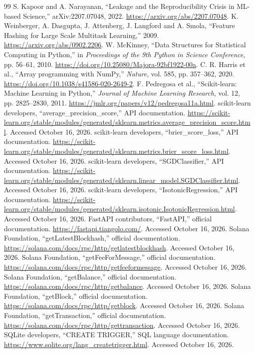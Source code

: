 \documentclass[12pt,a4paper,oneside]{report}
\begin{document}
\begin{thebibliography}{99}
 S. Kapoor and A. Narayanan, ``Leakage and the Reproducibility Crisis in ML-based Science,'' arXiv:2207.07048, 2022. \url{https://arxiv.org/abs/2207.07048}.
 K. Weinberger, A. Dasgupta, J. Attenberg, J. Langford and A. Smola, ``Feature Hashing for Large Scale Multitask Learning,'' 2009. \url{https://arxiv.org/abs/0902.2206}.
 W. McKinney, ``Data Structures for Statistical Computing in Python,'' in \emph{Proceedings of the 9th Python in Science Conference}, pp. 56--61, 2010. \url{https://doi.org/10.25080/Majora-92bf1922-00a}.
 C. R. Harris et al., ``Array programming with NumPy,'' \emph{Nature}, vol. 585, pp. 357--362, 2020. \url{https://doi.org/10.1038/s41586-020-2649-2}.
 F. Pedregosa et al., ``Scikit-learn: Machine Learning in Python,'' \emph{Journal of Machine Learning Research}, vol. 12, pp. 2825--2830, 2011. \url{https://jmlr.org/papers/v12/pedregosa11a.html}.
 scikit-learn developers, ``average\_precision\_score,'' API documentation. \url{https://scikit-learn.org/stable/modules/generated/sklearn.metrics.average_precision_score.html}. Accessed October 16, 2026.
 scikit-learn developers, ``brier\_score\_loss,'' API documentation. \url{https://scikit-learn.org/stable/modules/generated/sklearn.metrics.brier_score_loss.html}. Accessed October 16, 2026.
 scikit-learn developers, ``SGDClassifier,'' API documentation. \url{https://scikit-learn.org/stable/modules/generated/sklearn.linear_model.SGDClassifier.html}. Accessed October 16, 2026.
 scikit-learn developers, ``IsotonicRegression,'' API documentation. \url{https://scikit-learn.org/stable/modules/generated/sklearn.isotonic.IsotonicRegression.html}. Accessed October 16, 2026.
 FastAPI contributors, ``FastAPI,'' official documentation. \url{https://fastapi.tiangolo.com/}. Accessed October 16, 2026.
 Solana Foundation, ``getLatestBlockhash,'' official documentation. \url{https://solana.com/docs/rpc/http/getlatestblockhash}. Accessed October 16, 2026.
 Solana Foundation, ``getFeeForMessage,'' official documentation. \url{https://solana.com/docs/rpc/http/getfeeformessage}. Accessed October 16, 2026.
 Solana Foundation, ``getBalance,'' official documentation. \url{https://solana.com/docs/rpc/http/getbalance}. Accessed October 16, 2026.
 Solana Foundation, ``getBlock,'' official documentation. \url{https://solana.com/docs/rpc/http/getblock}. Accessed October 16, 2026.
 Solana Foundation, ``getTransaction,'' official documentation. \url{https://solana.com/docs/rpc/http/gettransaction}. Accessed October 16, 2026.
 SQLite developers, ``CREATE TRIGGER,'' SQL language documentation. \url{https://www.sqlite.org/lang_createtrigger.html}. Accessed October 16, 2026.
\end{thebibliography}
\endgroup
\end{document}
